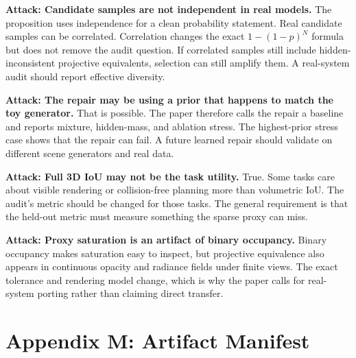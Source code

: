 \documentclass{article}
\begin{document}
\textbf{Attack: Candidate samples are not independent in real models.}
The proposition uses independence for a clean probability statement. Real
candidate samples can be correlated. Correlation changes the exact
$1-(1-p)^N$ formula but does not remove the audit question. If correlated
samples still include hidden-inconsistent projective equivalents, selection can
still amplify them. A real-system audit should report effective diversity.

\textbf{Attack: The repair may be using a prior that happens to match the toy
generator.}
That is possible. The paper therefore calls the repair a baseline and reports
mixture, hidden-mass, and ablation stress. The highest-prior stress case shows
that the repair can fail. A future learned repair should validate on different
scene generators and real data.

\textbf{Attack: Full 3D IoU may not be the task utility.}
True. Some tasks care about visible rendering or collision-free planning more
than volumetric IoU. The audit's metric should be changed for those tasks. The
general requirement is that the held-out metric must measure something the
sparse proxy can miss.

\textbf{Attack: Proxy saturation is an artifact of binary occupancy.}
Binary occupancy makes saturation easy to inspect, but projective equivalence
also appears in continuous opacity and radiance fields under finite views. The
exact tolerance and rendering model change, which is why the paper calls for
real-system porting rather than claiming direct transfer.

\section{Appendix M: Artifact Manifest}
\end{document}
